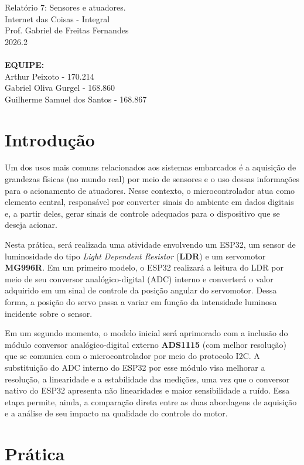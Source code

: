 \documentclass[a4paper,oneside,10pt]{article}
\begin{document}
\noindent Relatório 7: Sensores e atuadores. \\
Internet das Coisas - Integral\\
Prof. Gabriel de Freitas Fernandes\\
2026.2\\
\\
\textbf{EQUIPE:} \\ Arthur Peixoto - 170.214 \\ Gabriel Oliva Gurgel - 168.860 \\ Guilherme Samuel dos Santos - 168.867

\section{Introdução}
Um dos usos mais comuns relacionados aos sistemas embarcados é a aquisição de grandezas físicas (no mundo real) por meio de sensores e o uso dessas informações para o acionamento de atuadores. Nesse contexto, o microcontrolador atua como elemento central, responsável por converter sinais do ambiente em dados digitais e, a partir deles, gerar sinais de controle adequados para o dispositivo que se deseja acionar.

Nesta prática, será realizada uma atividade envolvendo um ESP32, um sensor de luminosidade do tipo \textit{Light Dependent Resistor} (\textbf{LDR}) e um servomotor \textbf{MG996R}. Em um primeiro modelo, o ESP32 realizará a leitura do LDR por meio de seu conversor analógico-digital (ADC) interno e converterá o valor adquirido em um sinal de controle da posição angular do servomotor. Dessa forma, a posição do servo passa a variar em função da intensidade luminosa incidente sobre o sensor.

Em um segundo momento, o modelo inicial será aprimorado com a inclusão do módulo conversor analógico-digital externo \textbf{ADS1115} (com melhor resolução) que se comunica com o microcontrolador por meio do protocolo I2C. A substituição do ADC interno do ESP32 por esse módulo visa melhorar a resolução, a linearidade e a estabilidade das medições, uma vez que o conversor nativo do ESP32 apresenta não linearidades e maior sensibilidade a ruído. Essa etapa permite, ainda, a comparação direta entre as duas abordagens de aquisição e a análise de seu impacto na qualidade do controle do motor.

\section{Prática}
\end{document}

